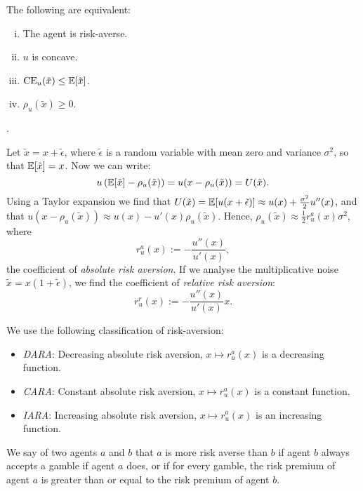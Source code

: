 \documentclass[twoside, titlepage]{article}
\begin{document}
\begin{proposition}
    The following are equivalent:
    \begin{enumerate}[(i)]
        \item The agent is risk-averse.
        \item $u$ is concave.
        \item $\text{CE}_u(\tilde{x}) \leq \mathbb{E}[\tilde{x}]$.
        \item $\rho_u(\tilde{x}) \geq 0$.
    \end{enumerate}
    \begin{explanation}
        .
    \end{explanation}
\end{proposition}
Let $\tilde{x} = x + \tilde{\epsilon}$, where $\tilde{\epsilon}$ is a random variable with mean zero and variance $\sigma^2$, so that $\mathbb{E}[\tilde{x}] = x$. Now we can write:
\[
    u\left(\mathbb{E}[\tilde{x}] - \rho_u(\tilde{x})\right) = u(x - \rho_u(\tilde{x})) = U(\tilde{x}).
\]
Using a Taylor expansion we find that $U(\tilde{x}) = \mathbb{E}[u(x + \tilde{\epsilon})] \approx u(x) + \frac{\sigma^2}{2}u''(x)$, and that $u(x - \rho_u(\tilde{x}))  \approx u(x) - u'(x)\rho_u(\tilde{x})$. Hence, $\rho_u(\tilde{x}) \approx \frac{1}{2} r^a_u(x)\sigma^2$, where
\[
    r^a_u(x) := -\frac{u''(x)}{u'(x)},
\]
the coefficient of \textit{absolute risk aversion}. If we analyse the multiplicative noise $\tilde{x} = x(1 + \tilde{\epsilon})$, we find the coefficient of \textit{relative risk aversion}:
\[
    r^r_u(x) := -\frac{u''(x)}{u'(x)}x.
\]

We use the following classification of risk-aversion:
\begin{itemize}
    \item \textit{DARA}: Decreasing absolute risk aversion, $x \mapsto r^a_u(x)$ is a decreasing function.
    \item \textit{CARA}: Constant absolute risk aversion, $x \mapsto r^a_u(x)$ is a constant function.
    \item \textit{IARA}: Increasing absolute risk aversion, $x \mapsto r^a_u(x)$ is an increasing function.
\end{itemize}
We say of two agents $a$ and $b$ that $a$ is more risk averse than $b$ if agent $b$ always accepts a gamble if agent $a$ does, or if for every gamble, the risk premium of agent $a$ is greater than or equal to the risk premium of agent $b$.

\end{document}
